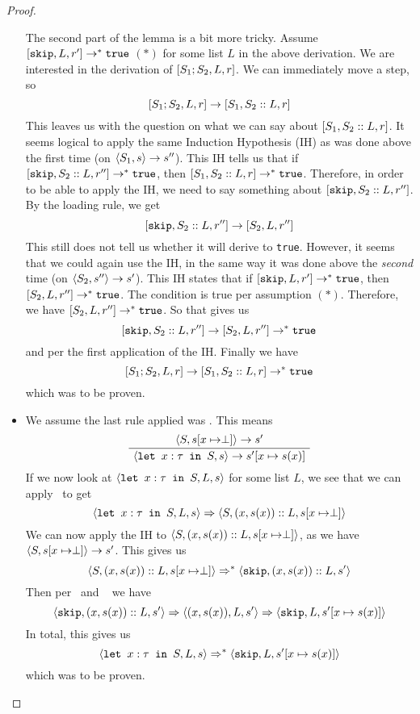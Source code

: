 \begin{proof}
\begin{itemize}[noitemsep]
    The second part of the lemma is a bit more tricky. Assume $[ \texttt{skip}, L, r' ] \to ^{*} \texttt{true}$ $( * )$ for some list $L$ in the above derivation. We are interested in the derivation of $[ S_1;S_2, L, r ]$. We can immediately move a step, so
    $$[ S_1;S_2, L, r ] \to [ S_1, S_2::L, r ]$$
    This leaves us with the question on what we can say about $[ S_1, S_2::L, r ]$. It seems logical to apply the same Induction Hypothesis (IH) as was done above the first time (on $\langle S_1, s \rangle \to s''$). This IH tells us that if $[ \texttt{skip}, S_2::L, r'' ] \to ^{*} \texttt{true}$, then $[ S_1, S_2::L, r ] \to ^{*} \texttt{true}$. Therefore, in order to be able to apply the IH, we need to say something about $[ \texttt{skip}, S_2::L, r'' ]$. By the loading rule, we get
    $$[ \texttt{skip}, S_2::L, r'' ] \to [ S_2, L, r'' ]$$
    This still does not tell us whether it will derive to \texttt{true}. However, it seems that we could again use the IH, in the same way it was done above the \emph{second} time (on $\langle S_2, s'' \rangle \to s'$). This IH states that if $[ \texttt{skip}, L, r' ] \to ^{*} \texttt{true}$, then $[ S_2, L, r'' ] \to ^{*} \texttt{true}$. The condition is true per assumption $( * )$. Therefore, we have $[ S_2, L, r'' ] \to ^{*} \texttt{true}$. So that gives us
    $$[ \texttt{skip}, S_2::L, r'' ] \to [ S_2, L, r'' ] \to ^{*} \texttt{true}$$
    and per the first application of the IH. Finally we have
    $$[ S_1;S_2, L, r ] \to [ S_1, S_2::L, r ]  \to ^{*} \texttt{true}$$
    which was to be proven. 
    \item We assume the last rule applied was . This means
    $$\AxiomC{$\ns{S}{s[x\mapsto \perp]}{s'}$}
\UnaryInfC{$\ns{\letm{x}{S}}{s}{s'[x \mapsto s(x)]}$}
\DisplayProof$$
    If we now look at $\langle \texttt{let }x : \tau \texttt{ in } S, L, s \rangle$ for some list $L$, we see that we can apply  ~to get 
    $$\langle \texttt{let }x : \tau \texttt{ in } S, L, s \rangle \Rightarrow \langle S, (x,s(x))::L, s[x\mapsto \perp] \rangle$$
    We can now apply the IH to $\langle S, (x,s(x))::L, s[x\mapsto \perp] \rangle$, as we have $\langle S, s[x\mapsto \perp] \rangle \to s'$. This gives us
    $$\langle S, (x,s(x))::L, s[x\mapsto \perp] \rangle \Rightarrow ^{*} \langle \texttt{skip}, (x,s(x))::L, s' \rangle$$
    Then per \loadsos ~and \setsos ~ we have
    $$\langle \texttt{skip}, (x,s(x))::L, s' \rangle \Rightarrow \langle (x,s(x)), L, s' \rangle \Rightarrow \langle \texttt{skip}, L, s'[x \mapsto s(x)] \rangle$$
    In total, this gives us
    $$\langle \texttt{let }x : \tau \texttt{ in } S, L, s \rangle \Rightarrow ^{*} \langle \texttt{skip}, L, s'[x \mapsto s(x)] \rangle $$
    which was to be proven.
    

\end{itemize}
\end{proof}
